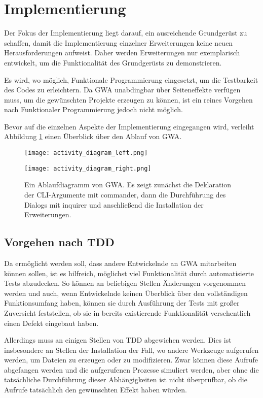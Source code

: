 \section{Implementierung}
\label{implementierung}

Der Fokus der Implementierung liegt darauf, ein ausreichende Grundgerüst zu schaffen, damit die Implementierung einzelner Erweiterungen keine neuen Herausforderungen aufweist. Daher werden Erweiterungen nur exemplarisch entwickelt, um die Funktionalität des Grundgerüsts zu demonstrieren.

Es wird, wo möglich, Funktionale Programmierung eingesetzt, um die Testbarkeit des Codes zu erleichtern. Da \gls{GWA} unabdingbar über Seiteneffekte verfügen muss, um die gewünschten Projekte erzeugen zu können, ist ein reines Vorgehen nach Funktionaler Programmierung jedoch nicht möglich.

Bevor auf die einzelnen Aspekte der Implementierung eingegangen wird, verleiht Abbildung \ref{fig:impl:activity_diagram} einen Überblick über den Ablauf von \gls{GWA}.

  \begin{figure}
	\centering
		\texttt{[image: activity\_diagram\_left.png]}
  \end{figure}

  \begin{figure}
	\centering
		\texttt{[image: activity\_diagram\_right.png]}
      	\caption{Ein Ablaufdiagramm von \gls{GWA}. Es zeigt zunächst die Deklaration der \gls{CLI}-Argumente mit commander, dann die Durchführung des Dialogs mit inquirer und anschließend die Installation der Erweiterungen.}
		\label{fig:impl:activity_diagram}
  \end{figure}

\subsection{Vorgehen nach TDD}
Da ermöglicht werden soll, dass andere Entwickelnde an \gls{GWA} mitarbeiten können sollen, ist es hilfreich, möglichst viel Funktionalität durch automatisierte Tests abzudecken. So können an beliebigen Stellen Änderungen vorgenommen werden und auch, wenn Entwickelnde keinen Überblick über den vollständigen Funktionsumfang haben, können sie durch Ausführung der Tests mit großer Zuversicht feststellen, ob sie in bereits existierende Funktionalität versehentlich einen Defekt eingebaut haben.

Allerdings muss an einigen Stellen von \gls{TDD} abgewichen werden. Dies ist insbesondere an Stellen der Installation der Fall, wo andere Werkzeuge aufgerufen werden, um Dateien zu erzeugen oder zu modifizieren. Zwar können diese Aufrufe abgefangen werden und die aufgerufenen Prozesse simuliert werden, aber ohne die tatsächliche Durchführung dieser Abhängigkeiten ist nicht überprüfbar, ob die Aufrufe tatsächlich den gewünschten Effekt haben würden.

